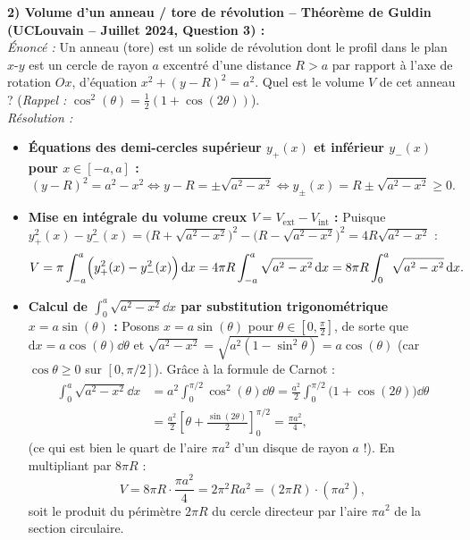 \begin{exemple}
\medskip
\textbf{2) Volume d'un anneau / tore de révolution -- Théorème de Guldin (UCLouvain -- Juillet 2024, Question 3) :}\\
\emph{Énoncé :} Un anneau (tore) est un solide de révolution dont le profil dans le plan $x$-$y$ est un cercle de rayon $a$ excentré d'une distance $R > a$ par rapport à l'axe de rotation $Ox$, d'équation $x^2 + (y - R)^2 = a^2$. Quel est le volume $V$ de cet anneau ? (\emph{Rappel :} $\cos^2(\theta) = \frac{1}{2}(1 + \cos(2\theta))$).\\
\emph{Résolution :}
\begin{itemize}
    \item \textbf{Équations des demi-cercles supérieur $y_+(x)$ et inférieur $y_-(x)$ pour $x \in [-a, a]$ :}
    \[
        (y - R)^2 = a^2 - x^2 \iff y - R = \pm\sqrt{a^2 - x^2} \iff y_\pm(x) = R \pm \sqrt{a^2 - x^2} \ge 0.
    \]
    \item \textbf{Mise en intégrale du volume creux $V = V_{\text{ext}} - V_{\text{int}}$ :}
    Puisque $y_+^2(x) - y_-^2(x) = \bigl(R + \sqrt{a^2-x^2}\bigr)^2 - \bigl(R - \sqrt{a^2-x^2}\bigr)^2 = 4R\sqrt{a^2 - x^2}$ :
    \[
        V = \pi \int_{-a}^a \Bigl(y_+^2(x) - y_-^2(x)\Bigr)\,\mathrm{d} x = 4\pi R \int_{-a}^a \sqrt{a^2 - x^2}\,\mathrm{d} x = 8\pi R \int_0^a \sqrt{a^2 - x^2}\,\mathrm{d} x.
    \]
    \item \textbf{Calcul de $\displaystyle\int_0^a \sqrt{a^2 - x^2}\dd x$ par substitution trigonométrique $x = a\sin(\theta)$ :}
    Posons $x = a\sin(\theta)$ pour $\theta \in \left[0, \frac{\pi}{2}\right]$, de sorte que $\mathrm{d}x = a\cos(\theta)\dd\theta$ et $\sqrt{a^2 - x^2} = \sqrt{a^2(1-\sin^2\theta)} = a\cos(\theta)$ (car $\cos\theta \ge 0$ sur $[0, \pi/2]$). Grâce à la formule de Carnot :
    \begin{align*}
        \int_0^a \sqrt{a^2 - x^2}\dd x &= a^2 \int_0^{\pi/2} \cos^2(\theta)\dd\theta = \frac{a^2}{2}\int_0^{\pi/2} \bigl(1 + \cos(2\theta)\bigr)\dd\theta \\
        &= \frac{a^2}{2}\left[\theta + \frac{\sin(2\theta)}{2}\right]_0^{\pi/2} = \frac{\pi a^2}{4},
    \end{align*}
    (ce qui est bien le quart de l'aire $\pi a^2$ d'un disque de rayon $a$ !). En multipliant par $8\pi R$ :
    \[
        \boxed{V = 8\pi R \cdot \frac{\pi a^2}{4} = 2\pi^2 R a^2 = (2\pi R)\cdot(\pi a^2)},
    \]
    soit le produit du périmètre $2\pi R$ du cercle directeur par l'aire $\pi a^2$ de la section circulaire.
\end{itemize}


\end{exemple}
